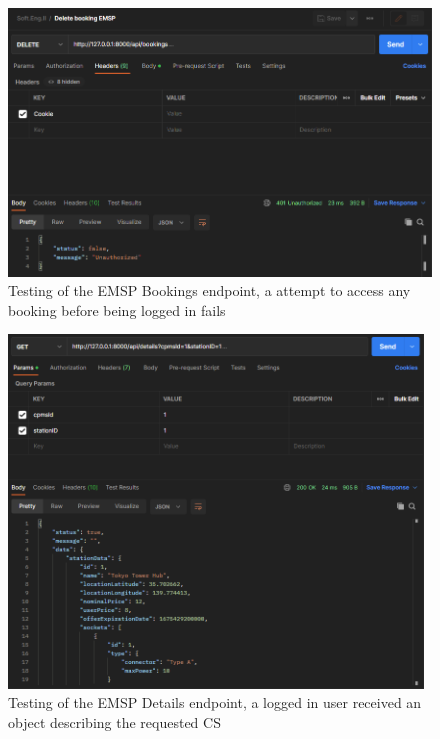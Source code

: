 \documentclass[11pt]{article}
\begin{document}
\begin{enumerate}
    \begin{figure}[!ht]
        \centering
        \includegraphics[width=130mm]{DeleteBookingFail.PNG}
        \captionsetup{justification=centering,margin=2cm}
        \caption{Testing of the EMSP Bookings endpoint, a attempt to access any booking before being logged in fails}
        \label{fig:my_label}
    \end{figure}
    
    \newpage

    \begin{figure}[!ht]
        \centering
        \includegraphics[width=110mm]{CSDetails.PNG}
        \captionsetup{justification=centering,margin=2cm}
        \caption{Testing of the EMSP Details endpoint, a logged in user received an object describing the requested CS}
        \label{fig:my_label}
    \end{figure}
    

\end{enumerate}
\end{document}
